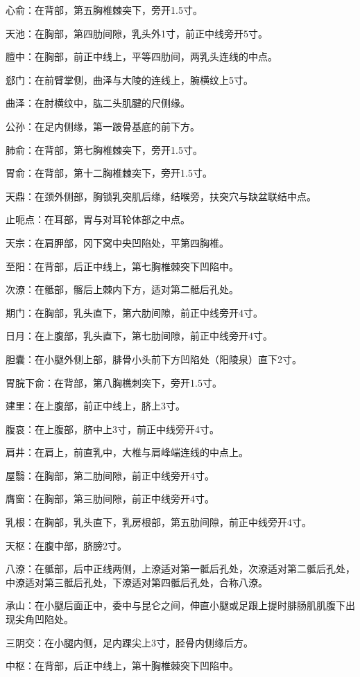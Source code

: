 \documentclass[12pt,UTF8,openany]{ctexbook}
\begin{document}
心俞：在背部，第五胸椎棘突下，旁开1.5寸。

天池：在胸部，第四肋间隙，乳头外1寸，前正中线旁开5寸。

膻中：在胸部，前正中线上，平等四肋间，两乳头连线的中点。

郄门：在前臂掌侧，曲泽与大陵的连线上，腕横纹上5寸。

曲泽：在肘横纹中，肱二头肌腱的尺侧缘。

公孙：在足内侧缘，第一跛骨基底的前下方。

肺俞：在背部，第七胸椎棘突下，旁开1.5寸。

胃俞：在背部，第十二胸椎棘突下，旁开1.5寸。

天鼎：在颈外侧部，胸锁乳突肌后缘，结喉旁，扶突穴与缺盆联结中点。

止呃点：在耳部，胃与对耳轮体部之中点。

天宗：在肩胛部，冈下窝中央凹陷处，平第四胸椎。

至阳：在背部，后正中线上，第七胸椎棘突下凹陷中。

次潦：在骶部，髂后上棘内下方，适对第二骶后孔处。

期门：在胸部，乳头直下，第六肋间隙，前正中线旁开4寸。

日月：在上腹部，乳头直下，第七肋间隙，前正中线旁开4寸。

胆囊：在小腿外侧上部，腓骨小头前下方凹陷处（阳陵泉）直下2寸。

胃脘下俞：在背部，第八胸樵刺突下，旁开1.5寸。

建里：在上腹部，前正中线上，脐上3寸。

腹哀：在上腹部，脐中上3寸，前正中线旁开4寸。

肩井：在肩上，前直乳中，大椎与肩峰端连线的中点上。

屋翳：在胸部，第二肋间隙，前正中线旁开4寸。

膺窗：在胸部，第三肋间隙，前正中线旁开4寸。

乳根：在胸部，乳头直下，乳房根部，第五肋间隙，前正中线旁开4寸。

天枢：在腹中部，脐膀2寸。

八潦：在骶部，后中正线两侧，上潦适对第一骶后孔处，次潦适对第二骶后孔处，中潦适对第三骶后孔处，下潦适对第四骶后孔处，合称八潦。

承山：在小腿后面正中，委中与昆仑之间，伸直小腿或足跟上提时腓肠肌肌腹下出现尖角凹陷处。

三阴交：在小腿内侧，足内踝尖上3寸，胫骨内侧缘后方。

中枢：在背部，后正中线上，第十胸椎棘突下凹陷中。
\end{document}
